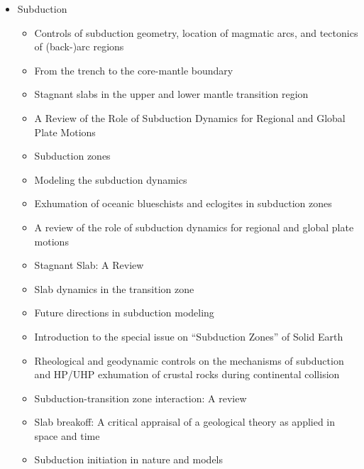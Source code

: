\begin{itemize}

\item Subduction
   \begin{itemize}
   \item [\nineteeneightytwo] Controls of subduction geometry, location of magmatic arcs, 
         and tectonics of (back-)arc regions \cite{crpi82}
   \item [\nineteenninetyfive] From the trench to the core-mantle boundary \cite{kinc95}
   \item [\twothousandone] Stagnant slabs in the upper and lower mantle transition region \cite{fuwo01}
   \item [\twothousandone] A Review of the Role of Subduction Dynamics for Regional and Global Plate Motions \cite{befa09}
   \item [\twothousandtwo] Subduction zones \cite{ster02}
   \item [\twothousandeight] Modeling the subduction dynamics \cite{bill08}
   \item [\twothousandnine] Exhumation of oceanic blueschists and eclogites in subduction zones \cite{agyj09}
   \item [\twothousandnine] A review of the role of subduction dynamics for regional and global plate motions \cite{befa09}
   \item [\twothousandnine] Stagnant Slab: A Review \cite{fuon09}
   \item [\twothousandten] Slab dynamics in the transition zone \cite{bill10}
   \item [\twothousandeleven] Future directions in subduction modeling \cite{gery11}
   \item [\twothousandthirteen] Introduction to the special issue on “Subduction Zones” of Solid Earth \cite{bufv13}
   \item [\twothousandfourteen] Rheological and geodynamic controls on the mechanisms of subduction and HP/UHP exhumation 
                of crustal rocks during continental collision \cite{bufa14,bufy14b}
   \item [\twothousandseventeen] Subduction-transition zone interaction: A review \cite{goav17}
   \item [\twothousandeighteen] Slab breakoff: A critical appraisal of a geological theory as applied in space and time \cite{garm18}
   \item [\twothousandeighteen] Subduction initiation in nature and models \cite{stge18}
   \end{itemize}


\end{itemize}
